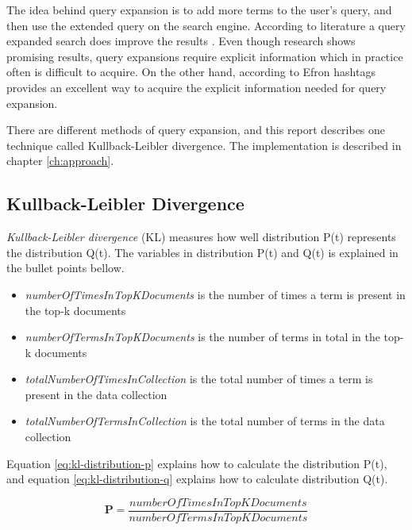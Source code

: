 The idea behind query expansion is to add more terms to the user's query, and then use the extended query on the search engine.
According to literature a query expanded search does improve the results \cite[ch. 5]{ir-book}.
Even though research shows promising results, query expansions require explicit information which in practice often is difficult to acquire.
On the other hand, according to Efron \cite{ir-hashtag} hashtags provides an excellent way to acquire the explicit information needed for query expansion.

There are different methods of query expansion, and this report describes one technique called Kullback-Leibler divergence.
The implementation is described in chapter \ref{ch:approach}.

\subsection{Kullback-Leibler Divergence}
\textit{Kullback-Leibler divergence} (KL) measures how well distribution P(t) represents the distribution Q(t).
The variables in distribution P(t) and Q(t) is explained in the bullet points bellow.

\begin{itemize}
	\item \textit{numberOfTimesInTopKDocuments} is the number of times a term is present in the top-k documents
	\item \textit{numberOfTermsInTopKDocuments} is the number of terms in total in the top-k documents
	\item \textit{totalNumberOfTimesInCollection} is the total number of times a term is present in the data collection
	\item \textit{totalNumberOfTermsInCollection} is the total number of terms in the data collection
\end{itemize}

Equation \ref{eq:kl-distribution-p} explains how to calculate the distribution P(t),
and equation \ref{eq:kl-distribution-q} explains how to calculate distribution Q(t).

\begin{cequation}[H]
	\begin{equation}
		\mathbf{P} = \frac{numberOfTimesInTopKDocuments}{numberOfTermsInTopKDocuments}
	\end{equation}
	\caption{}
  \label{eq:kl-distribution-p}
\end{cequation}

